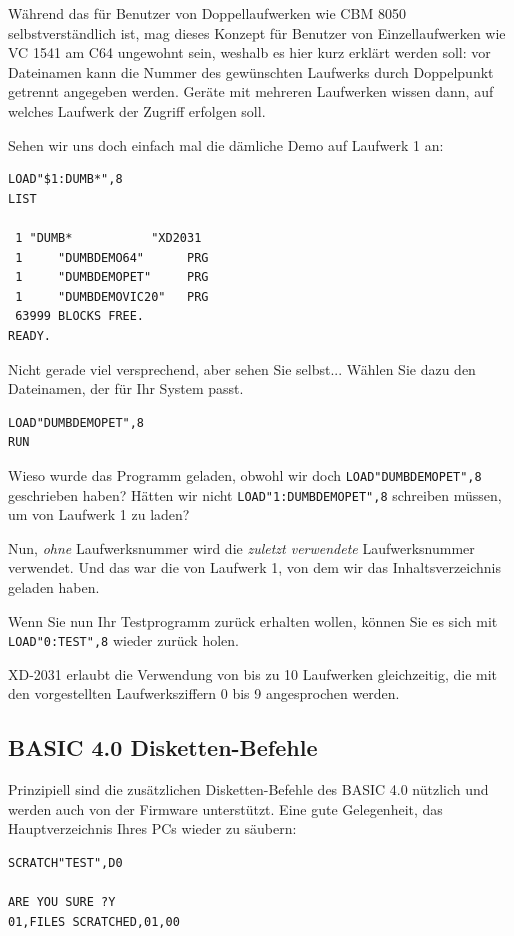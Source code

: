 \documentclass[10pt,a4paper]{scrartcl}		%
\begin{document}
Während das für Benutzer von Doppellaufwerken
wie CBM 8050 selbstverständlich ist, mag dieses Konzept für Benutzer
von Einzellaufwerken wie VC 1541 am C64 ungewohnt sein, weshalb es
hier kurz erklärt werden soll: vor Dateinamen kann die Nummer des gewünschten
Laufwerks durch Doppelpunkt getrennt angegeben werden. Geräte mit
mehreren Laufwerken wissen dann, auf welches Laufwerk der Zugriff
erfolgen soll.

Sehen wir uns doch einfach mal die dämliche Demo auf Laufwerk 1 an:

\begin{verbatim}
LOAD"$1:DUMB*",8
LIST

 1 "DUMB*           "XD2031
 1     "DUMBDEMO64"      PRG
 1     "DUMBDEMOPET"     PRG
 1     "DUMBDEMOVIC20"   PRG
 63999 BLOCKS FREE.
READY.
\end{verbatim}

Nicht gerade viel versprechend, aber sehen Sie selbst... 
Wählen Sie dazu den Dateinamen, der für Ihr System passt.

\begin{verbatim}
LOAD"DUMBDEMOPET",8
RUN
\end{verbatim}

Wieso wurde das Programm geladen, obwohl wir doch \texttt{LOAD"DUMBDEMOPET",8} 
geschrieben haben? Hätten wir nicht \texttt{LOAD"1:DUMBDEMOPET",8} schreiben müssen,
um von Laufwerk 1 zu laden?

Nun, \textit{ohne} Laufwerksnummer wird die \textit{zuletzt verwendete}
Laufwerksnummer verwendet. Und das war die von Laufwerk 1, von dem wir
das Inhaltsverzeichnis geladen haben.

Wenn Sie nun Ihr Testprogramm zurück erhalten wollen, können Sie
es sich mit \texttt{LOAD"0:TEST",8} wieder zurück holen.

XD-2031 erlaubt die Verwendung von bis zu 10 Laufwerken gleichzeitig,
die mit den vorgestellten Laufwerksziffern 0 bis 9 angesprochen
werden.

\subsection{BASIC 4.0 Disketten-Befehle}
Prinzipiell sind die zusätzlichen Disketten-Befehle des BASIC 4.0
nützlich und werden auch von der Firmware unterstützt. 
Eine gute Gelegenheit, das Hauptverzeichnis Ihres PCs
wieder zu säubern:

\begin{verbatim}
SCRATCH"TEST",D0

ARE YOU SURE ?Y
01,FILES SCRATCHED,01,00
\end{verbatim}
\end{document}
